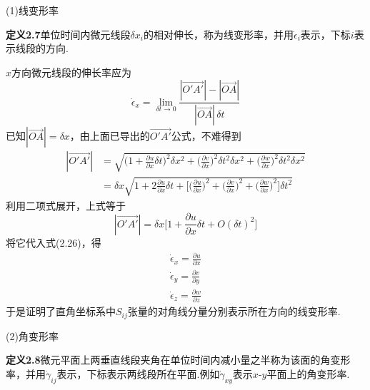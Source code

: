 (1)线变形率

\noindent\textbf{定义2.7}\quad 单位时间内微元线段$\delta x_i$的相对伸长，称为线变形率，并用$\dot{\epsilon}_i$表示，下标$i$表示线段的方向.

$x$方向微元线段的伸长率应为
\begin{equation*}
\dot{\epsilon}_x=\lim_{\delta t\to 0}\frac{|\overrightarrow{O'A'}|-|\overrightarrow{OA}|}{|\overrightarrow{OA}|\,\delta t}
\tag{2.26}
\end{equation*}
已知$|\overrightarrow{OA}|=\delta x$，由上面已导出的$\overrightarrow{O'A'}$公式，不难得到
\begin{align*}
|\overrightarrow{O'A'}|&=\sqrt{\Big(1+\frac{\partial u}{\partial x}\delta t\Big)^{2}\delta x^{2}+\Big(\frac{\partial v}{\partial x}\Big)^{2}\delta t^{2}\delta x^{2}+\Big(\frac{\partial w}{\partial x}\Big)^{2}\delta t^{2}\delta x^{2}}\\
&=\delta x\sqrt{1+2\frac{\partial u}{\partial x}\delta t+\Big[\Big(\frac{\partial u}{\partial x}\Big)^{2}+\Big(\frac{\partial v}{\partial x}\Big)^{2}+\Big(\frac{\partial w}{\partial x}\Big)^{2}\Big]\delta t^{2}}
\end{align*}
利用二项式展开，上式等于
\[
|\overrightarrow{O'A'}|=\delta x\Big[1+\frac{\partial u}{\partial x}\delta t+O(\delta t)^{2}\Big]
\]
将它代入式(2.26)，得
\begin{gather*}
\dot{\epsilon}_x=\frac{\partial u}{\partial x}\tag{2.27a}\\[2pt]
\dot{\epsilon}_y=\frac{\partial v}{\partial y}\tag{2.27b}\\[2pt]
\dot{\epsilon}_z=\frac{\partial w}{\partial z}\tag{2.27c}
\end{gather*}
于是证明了直角坐标系中$S_{ij}$张量的对角线分量分别表示所在方向的线变形率.

(2)角变形率

\noindent\textbf{定义2.8}\quad 微元平面上两垂直线段夹角在单位时间内减小量之半称为该面的角变形率，并用$\dot{\gamma}_{ij}$表示，下标表示两线段所在平面.例如$\dot{\gamma}_{xy}$表示$x\text{-}y$平面上的角变形率.

